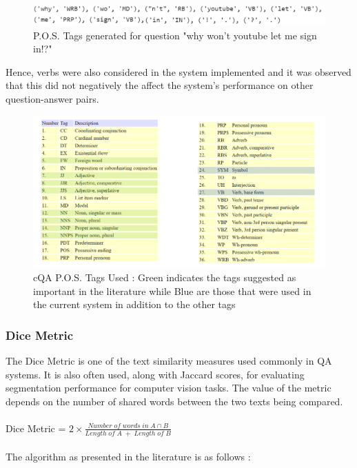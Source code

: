 \documentclass[12pt, a4paper]{article}
\begin{document}
\begin{figure}[h]
    \includegraphics[scale=0.5]{pos tags youtube.png} 
    \centering 
    \caption{P.O.S. Tags generated for question "why won't youtube let me sign in!?"}
    \centering 
\end{figure} 

Hence, verbs were also considered in the system implemented and it was observed that this did not negatively the affect the system's performance on other question-answer pairs. 

\begin{figure}[h]
    \includegraphics[scale=0.5]{pos cqa.png} 
    \centering 
    \caption{cQA P.O.S. Tags Used : Green indicates the tags suggested as important in the literature while Blue are those that were used in the current system in addition to the other tags}
    \centering 
\end{figure} 

\subsubsection{Dice Metric} 

The Dice Metric is one of the text similarity measures used commonly in QA systems. It is also often used, along with Jaccard scores, for evaluating segmentation performance for computer vision tasks. \cite{dice} The value of the metric depends on the number of shared words between the two texts being compared. 
\\~\\ 
Dice Metric = \(2 \times \frac{Number\; of\; words\; in\; A\cap B}{Length\; of\; A\; +\; Length\; of\; B}\)
\\~\\ 
The algorithm as presented in the literature \cite{maincqa} is as follows :
\end{document}
